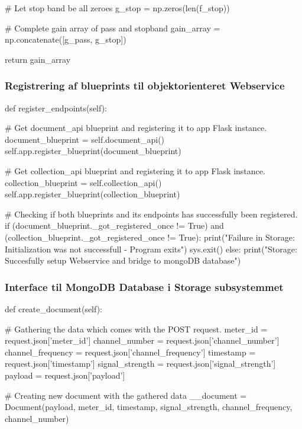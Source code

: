 \begin{appendices}
\begin{python}
	# Let stop band be all zeroes
	g_stop = np.zeros(len(f_stop))
	
	# Complete gain array of pass and stopband
	gain_array = np.concatenate([g_pass, g_stop])
	
	return gain_array
\end{python}

\subsubsection{Registrering af blueprints til objektorienteret Webservice}
\begin{python}
	def register_endpoints(self):
	
	# Get document_api blueprint and registering it to app Flask instance.
	document_blueprint = self.document_api()
	self.app.register_blueprint(document_blueprint)
	
	# Get collection_api blueprint and registering it to app Flask instance.
	collection_blueprint = self.collection_api()
	self.app.register_blueprint(collection_blueprint)
	
	# Checking if both blueprints and its endpoints has successfully been registered.
	if (document_blueprint._got_registered_once != True) and (collection_blueprint._got_registered_once != True):
	print("Failure in Storage: Initialization was not successfull - Program exits")
	sys.exit()
	else:
	print("Storage: Succesfully setup Webservice and bridge to mongoDB database")
	
\end{python}

\pagebreak
\subsubsection{Interface til MongoDB Database i Storage subsystemmet}
\begin{python}
	
	def create_document(self):
	
	# Gathering the data which comes with the POST request.
	meter_id = request.json['meter_id']
	channel_number = request.json['channel_number']
	channel_frequency = request.json['channel_frequency']
	timestamp = request.json['timestamp']
	signal_strength = request.json['signal_strength']
	payload = request.json['payload']
	
	# Creating new document with the gathered data
	__document = Document(payload, meter_id, timestamp, signal_strength, channel_frequency, channel_number)
	

\end{python}
\end{appendices}
